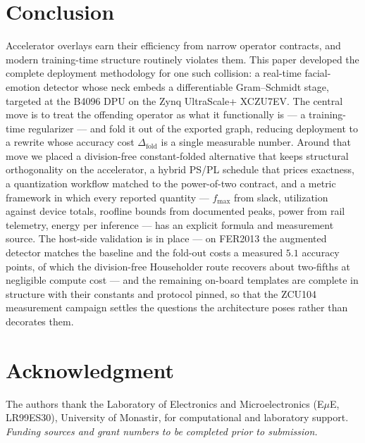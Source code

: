 \documentclass[onecolumn,journal]{IEEEtran}
\newcommand{\fmax}{f_{\mathrm{max}}}
\begin{document}
\section{Conclusion}\label{sec:conclusion}
Accelerator overlays earn their efficiency from narrow operator contracts, and modern
training-time structure routinely violates them. This paper developed the complete
deployment methodology for one such collision: a real-time facial-emotion detector
whose neck embeds a differentiable Gram--Schmidt stage, targeted at the B4096 DPU on
the Zynq UltraScale+ XCZU7EV. The central move is to treat the offending operator as
what it functionally is --- a training-time regularizer --- and fold it out of the
exported graph, reducing deployment to a rewrite whose accuracy cost
$\Delta_{\mathrm{fold}}$ is a single measurable number. Around that move we placed a
division-free constant-folded alternative that keeps structural orthogonality on the
accelerator, a hybrid PS/PL schedule that prices exactness, a quantization workflow
matched to the power-of-two contract, and a metric framework in which every reported
quantity --- $\fmax$ from slack, utilization against device totals, roofline bounds
from documented peaks, power from rail telemetry, energy per inference --- has an
explicit formula and measurement source. The host-side validation is in place ---
on FER2013 the augmented detector matches the baseline and the fold-out costs a
measured $5.1$ accuracy points, of which the division-free Householder route recovers
about two-fifths at negligible compute cost --- and the remaining on-board templates are
complete in structure with their constants and protocol pinned, so that the ZCU104
measurement campaign settles the questions the architecture poses rather than decorates
them.

\section*{Acknowledgment}
The authors thank the Laboratory of Electronics and Microelectronics (E$\mu$E,
LR99ES30), University of Monastir, for computational and laboratory support.
\textit{Funding sources and grant numbers to be completed prior to submission.}



\end{document}
